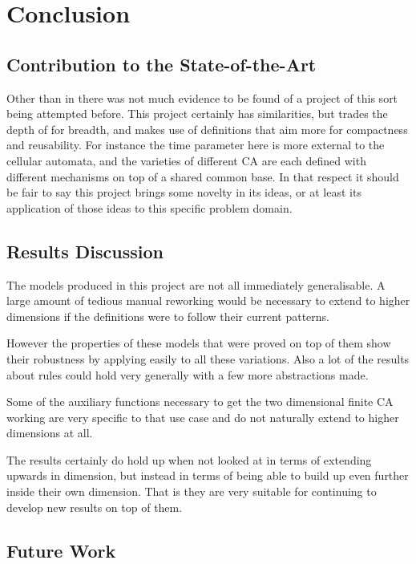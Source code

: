 \chapter{Conclusion}

\section{Contribution to the State-of-the-Art}

Other than in \cite{firing} there was not much evidence to be found of a project of this sort being attempted before.
This project certainly has similarities,
but trades the depth of \cite{firing} for breadth,
and makes use of definitions that aim more for compactness and reusability.
For instance the time parameter here is more external to the cellular automata,
and the varieties of different CA are each defined with different mechanisms on top of a shared common base.
In that respect it should be fair to say this project brings some novelty in its ideas,
or at least its application of those ideas to this specific problem domain.


\section{Results Discussion}

The models produced in this project are not all immediately generalisable. 
A large amount of tedious manual reworking would be necessary to extend to higher dimensions if the definitions were to follow their current patterns.

However the properties of these models that were proved on top of them show their robustness by applying easily to all these variations.
Also a lot of the results about rules could hold very generally with a few more abstractions made.

Some of the auxiliary functions necessary to get the two dimensional finite CA working are very specific to that use case and do not naturally extend to higher dimensions at all.

The results certainly do hold up when not looked at in terms of extending upwards in dimension,
but instead in terms of being able to build up even further inside their own dimension.
That is they are very suitable for continuing to develop new results on top of them.


\section{Future Work}

